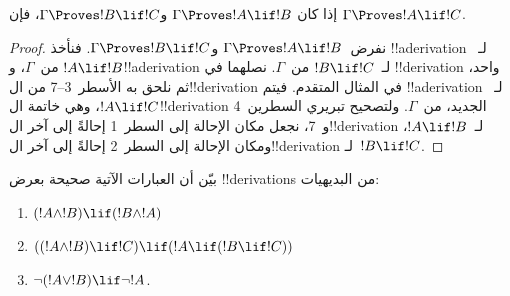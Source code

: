 \documentclass[../../../include/open-logic-section]{subfiles}
\begin{document}
\begin{prop}
   إذا كان $\Gamma \Proves !A \lif !B$ و$\Gamma
  \Proves !B \lif !C$، فإن $\Gamma \Proves !A \lif !C$.
\end{prop}

\begin{proof}
  نفرض~$\Gamma \Proves !A \lif !B$ و$\Gamma \Proves !B \lif
  !C$. فنأخذ !!a{derivation} لـ~$!A \lif !B$ من~$\Gamma$،
  و!!a{derivation} لـ~$!B \lif !C$ من~$\Gamma$.
  نصلهما في !!{derivation} واحد، ثم نلحق به الأسطر~3--7
  من ال!!{derivation} في المثال المتقدم. فيتم !!a{derivation}
  لـ~$!A \lif !C$، وهي خاتمة ال!!{derivation} الجديد،
  من~$\Gamma$. ولتصحيح تبريري السطرين~4 و~7، نجعل مكان الإحالة
  إلى السطر~1 إحالةً إلى آخر ال!!{derivation} لـ~$!A
  \lif !B$، ومكان الإحالة إلى السطر~2 إحالةً إلى آخر
  ال!!{derivation} لـ~$!B \lif !C$.
\end{proof}

\begin{prob}
بيّن أن العبارات الآتية صحيحة بعرض !!{derivation}s من البديهيات:
\begin{enumerate}
\item $(!A \land !B) \lif (!B \land !A)$
\item $((!A \land !B) \lif !C) \lif (!A \lif (!B \lif !C))$
\item $\lnot(!A \lor !B) \lif \lnot !A$.
\end{enumerate}
\end{prob}
\end{document}
